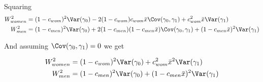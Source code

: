 Squaring
\begin{align*}
	W_{women}^2 &= (1 - c_{wom})^2 \Var(\gamma_0) - 2( 1 - c_{wom})c_{wom} \bar{x}\Cov(\gamma_0, \gamma_1) + c_{wom}^2 \bar{x} \Var(\gamma_1) \\
	W_{men}^2 &= (1 - c_{men})^2 \Var(\gamma_0) + 2( 1 - c_{men})(1 - c_{men} \bar{x})\Cov(\gamma_0, \gamma_1) + (1 - c_{men} \bar{x})^2 \Var(\gamma_1) \\
\end{align*} 

And assuming $\Cov(\gamma_0, \gamma_1) = 0$ we get

\begin{align*}
	W_{women}^2 &= (1 - c_{wom})^2 \Var(\gamma_0) + c_{wom}^2 \bar{x}^2 \Var(\gamma_1) \\
	W_{men}^2 &= (1 - c_{men})^2 \Var(\gamma_0) + (1 - c_{men} \bar{x})^2 \Var(\gamma_1) \\
\end{align*} 



